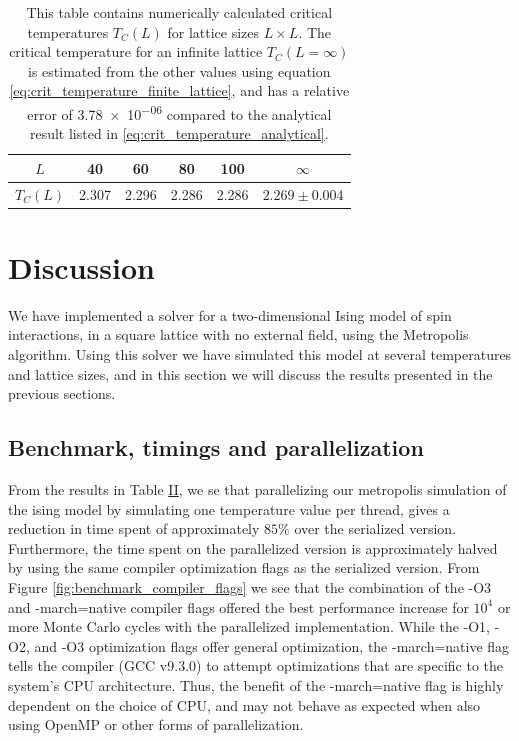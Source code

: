 \documentclass[reprint,english,notitlepage]{revtex4-1}  %
\begin{document}
\begin{table}[H]
\centering
\caption{This table contains numerically calculated critical temperatures $T_C(L)$ for lattice sizes $L \times L$. The critical temperature for an infinite lattice $T_C(L=\infty)$ is estimated from the other values using equation \eqref{eq:crit_temperature_finite_lattice}, and has a relative error of \num{3.78e-06} compared to the analytical result listed in \eqref{eq:crit_temperature_analytical}.} \label{table:crit_temps}
\begin{tabular}{|c|c|c|c|c|c|}
\hline
$L$ & 40 & 60 & 80 & 100 & $\infty$ \\
\hline
$T_C(L)$ & 2.307 & 2.296 & 2.286 & 2.286 & $2.269\pm 0.004$ \\
\hline
\end{tabular}
\end{table}


\newpage

\section{Discussion} \label{sec:V}

We have implemented a solver for a two-dimensional Ising model of spin interactions, in a square lattice with no external field, using the Metropolis algorithm. Using this solver we have simulated this model at several temperatures and lattice sizes, and in this section we will discuss the results presented in the previous sections.

\subsection{Benchmark, timings and parallelization} \label{sec:V:A}
From the results in Table \hyperref[table:benchmark_parallel]{II}, we se that parallelizing our metropolis simulation of the ising model by simulating one temperature value per thread, gives a reduction in time spent of approximately \(85\%\) over the serialized version. Furthermore, the time spent on the parallelized version is approximately halved by using the same compiler optimization flags as the serialized version. From Figure \ref{fig:benchmark_compiler_flags} we see that the combination of the -O3 and -march=native compiler flags offered the best performance increase for \(10^{4}\) or more Monte Carlo cycles with the parallelized implementation. While the -O1, -O2, and -O3 optimization flags offer general optimization, the -march=native flag tells the compiler (GCC v9.3.0) to attempt optimizations that are specific to the system's CPU architecture. Thus, the benefit of the -march=native flag is highly dependent on the choice of CPU, and may not behave as expected when also using OpenMP or other forms of parallelization.
\end{document}
